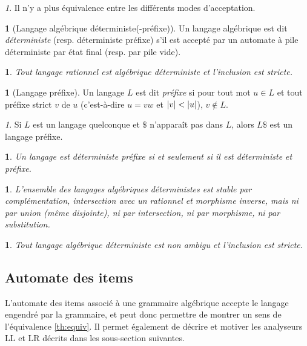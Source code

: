 \documentclass[10pt,a4paper,notitlepage]{article}
\theoremstyle{plain}
\theoremstyle{definition}
\newtheorem{defn}[thm]{\protect\definitionname}
\theoremstyle{definition}
\theoremstyle{remark}
\theoremstyle{remark}
\newtheorem{rem}[thm]{\protect\remarkname}
\theoremstyle{plain}
\theoremstyle{plain}
\newtheorem{prop}[thm]{\protect\propositionname}
\theoremstyle{plain}
\theoremstyle{remark}
\providecommand{\definitionname}{Définition}
\providecommand{\propositionname}{Proposition}
\providecommand{\remarkname}{Remarque}
\begin{document}
\begin{rem}
	Il n'y a plus équivalence entre les différents modes d'acceptation.
\end{rem}

\begin{defn}[Langage algébrique déterministe(-préfixe)] %
	Un langage algébrique est dit \emph{déterministe} (resp. déterministe préfixe) s'il est accepté par un automate à pile déterministe par état final (resp. par pile vide).
\end{defn}

\begin{prop}
	Tout langage rationnel est algébrique déterministe et l'inclusion est stricte.
\end{prop}

\begin{defn}[Langage préfixe]
	Un langage $L$ est dit \emph{préfixe} si pour tout mot $u\in L$ et tout préfixe strict $v$ de $u$ (c'est-à-dire $u=vw$ et $\left|v\right| < \left|u\right|$), $v\not\in L$.
\end{defn}

\begin{rem}
	Si $L$ est un langage quelconque et $\$$ n'apparaît pas dans $L$, alors $L\$$ est un langage préfixe.
\end{rem}

\begin{prop} %
	Un langage est déterministe préfixe si et seulement si il est déterministe et préfixe.
\end{prop}

\begin{prop}
	L'ensemble des langages algébriques déterministes est stable par complémentation, intersection avec un rationnel et morphisme inverse, mais ni par union (même disjointe), ni par intersection, ni par morphisme, ni par substitution.
\end{prop}

\begin{prop} %
	Tout langage algébrique déterministe est non ambigu et l'inclusion est stricte.
\end{prop}

\subsection{Automate des items}

L'automate des items associé à une grammaire algébrique accepte le langage engendré par la grammaire, et peut donc permettre de montrer un sens de l'équivalence \ref{th:equiv}. Il permet également de décrire et motiver les analyseurs LL et LR décrits dans les sous-section suivantes.
\end{document}

